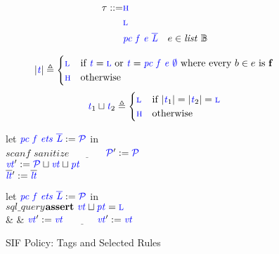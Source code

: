 \documentclass{llncs}
\begin{document}
\begin{figure}

  \begin{minipage}{0.3\textwidth}
    \color{blue}
    \begin{align*}
      \tau ::= & \textnormal{\color{blue} \sc h} \\
      & \textnormal{\color{blue} \sc l} \\
      & \mathit{\color{blue} pc ~ f ~ e ~ \overline{L}} & e \in \mathit{list} ~ \mathbb{B} \\
    \end{align*}
  \end{minipage}
  \begin{minipage}{0.69\textwidth}
    \[|\mathit{\color{blue} t}| \triangleq
    \begin{cases}
      \textnormal{\color{blue} \sc l} & \textnormal{if } \mathit{\color{blue} t} = \textnormal{\color{blue} \sc l} \textnormal{ or } \mathit{\color{blue} t} = \mathit{\color{blue} pc ~ f ~ e ~ \emptyset}
      \textnormal{ where every } b \in e \textnormal{ is } \mathbf{f} \\
      \textnormal{\color{blue} \sc h} & \textnormal{otherwise} \\
    \end{cases}\]
    \[\mathit{\color{blue} t}_1 \sqcup \mathit{\color{blue} t}_2 \triangleq
    \begin{cases}
      \textnormal{\color{blue} \sc l} & \textnormal{if } |\mathit{\color{blue} t}_1| = |\mathit{\color{blue} t}_2| = \textnormal{\color{blue} \sc l} \\
      \textnormal{\color{blue} \sc h} & \textnormal{otherwise} \\
    \end{cases}\]
  \end{minipage}

  \begin{minipage}{0.54\textwidth}
    \storetruleblock
        {let \(\mathit{\color{blue} pc ~ f ~ ets ~ \overline{L}} := \mathcal{\color{blue} P}\) in \\
                      {\(\mathit{scanf}\)}{\high}
                      {\(\mathit{sanitize}\)}{\low}
                      {\(\underline{\hspace{3em}}\)}
                      {\(\mathcal{\color{blue} P}' := \mathcal{\color{blue} P}\) \\
                        \(\mathit{\color{blue} vt}' := \mathcal{\color{blue} P} \sqcup \mathit{\color{blue} vt} \sqcup \mathit{\color{blue} pt}\) \\
                        \(\overline{\color{blue} \mathit{\color{blue} lt}}' := \overline{\color{blue} \mathit{\color{blue} lt}}\)}}
  \end{minipage}
  \begin{minipage}{0.45\textwidth}
    \loadtruleblock
        {let \(\mathit{\color{blue} pc ~ f ~ ets ~ \overline{L}} := \mathcal{\color{blue} P}\) in \\
                    {\(\mathit{sql\_query}\)}{\(\mathbf{assert} ~ \mathit{\color{blue} vt} \sqcup \mathit{\color{blue} pt} = \textnormal{\color{blue} \sc l}\) \\ & & \(\mathit{\color{blue} vt}' := \mathit{\color{blue} vt}\)}
                    {\(\underline{\hspace{3em}}\)}{\(\mathit{\color{blue} vt}' := \mathit{\color{blue} vt}\)}}

  \end{minipage}

\caption{SIF Policy: Tags and Selected Rules}
\label{fig:sif1}
\end{figure}
\end{document}
